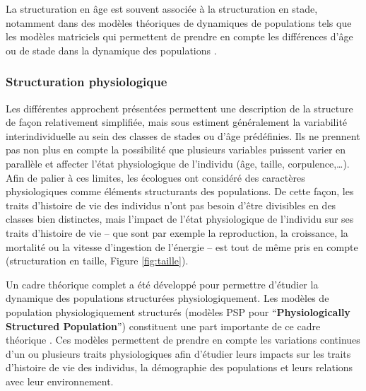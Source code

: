 La structuration en âge est souvent associée à la structuration en stade,
notamment dans des modèles théoriques de dynamiques de populations tels que les
modèles matriciels qui permettent de prendre en compte les différences d'âge ou
de stade dans la dynamique des populations
\autocites{caswell2001a,sarrazin2000demographic}. 

\subsubsection{Structuration physiologique}

Les différentes approchent présentées permettent une description de la structure
de façon relativement simplifiée, mais sous estiment généralement la variabilité
interindividuelle au sein des classes de stades ou d'âge prédéfinies. Ils ne
prennent pas non plus en compte la possibilité que plusieurs variables puissent
varier en parallèle et affecter l'état physiologique de l'individu (âge, taille,
corpulence,\ldots). Afin de palier à ces limites, les écologues ont considéré
des caractères physiologiques comme éléments structurants des populations. De cette façon, les traits
d'histoire de vie des individus n'ont pas besoin d'être divisibles en des
classes bien distinctes, mais l'impact de l'état physiologique de l'individu sur
ses traits d'histoire de vie -- que sont par exemple la reproduction, la
croissance, la mortalité ou la vitesse d'ingestion de l'énergie -- est tout de
même pris en compte 
(structuration en taille, Figure \ref{fig:taille}).

Un cadre théorique complet a été développé pour permettre d'étudier la dynamique
des populations structurées physiologiquement. Les modèles de
population physiologiquement structurés (modèles PSP pour
``\textbf{Physiologically Structured Population}'') constituent une part
importante de ce cadre théorique \autocites{metz1986a,de-roos1992a,de-roos1997a}. Ces modèles permettent de
prendre en compte les variations continues d'un ou plusieurs traits
physiologiques afin d'étudier leurs impacts sur les traits d'histoire de vie
des individus, la démographie des populations et leurs relations avec leur
environnement.


